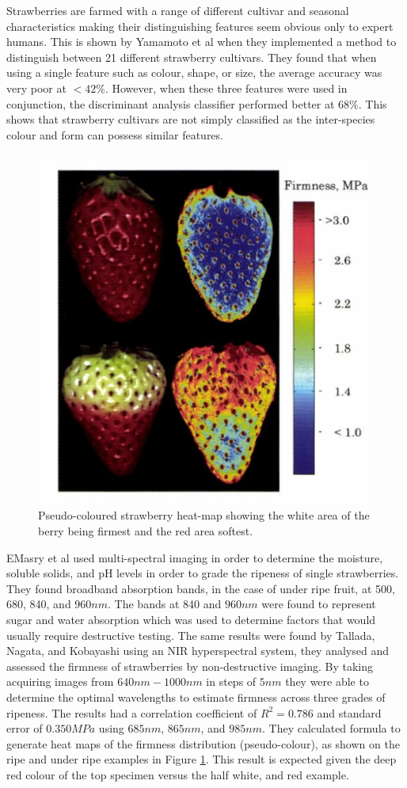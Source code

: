 \documentclass[fleqn,twoside,12pt]{report}
\begin{document}
Strawberries are farmed with a range of different cultivar and seasonal characteristics making their distinguishing features seem obvious only to expert humans. This is shown by Yamamoto et al \cite{yamamoto} when they implemented a method to distinguish between 21 different strawberry cultivars. They found that when using a single feature such as colour, shape, or size, the average accuracy was very poor at $<42\%$. However, when these three features were used in conjunction, the discriminant analysis classifier performed better at $68\%$. This shows that strawberry cultivars are not simply classified as the inter-species colour and form can possess similar features. 


\begin{figure}[h]
	\centering
	\includegraphics[width=0.5\linewidth]{multispec_strawberry.png}
	\caption{Pseudo-coloured strawberry heat-map showing the white area of the berry being firmest and the red area softest.}
	\label{fig:multispec_strawberry}
\end{figure}%

EMasry et al \cite{elmasry2} used multi-spectral imaging in order to determine the moisture, soluble solids, and pH levels in order to grade the ripeness of single strawberries. They found broadband absorption bands, in the case of under ripe fruit, at 500, 680, 840, and $960nm$. The bands at 840 and $960nm$ were found to represent sugar and water absorption which was used to determine factors that would usually require destructive testing. The same results were found by Tallada, Nagata, and Kobayashi \cite{tallada} using an NIR hyperspectral system, they analysed and assessed the firmness of strawberries by non-destructive imaging. By taking acquiring images from $640nm-1000nm$ in steps of $5nm$ they were able to determine the optimal wavelengths to estimate firmness across three grades of ripeness. The results had a correlation coefficient of $R^2=0.786$ and standard error of $0.350MPa$ using $685nm$, $865nm$, and $985nm$. They calculated formula to generate heat maps of the firmness distribution (pseudo-colour), as shown on the ripe and under ripe examples in Figure \ref{fig:multispec_strawberry}. This result is expected given the deep red colour of the top specimen versus the half white, and red example.
\end{document}
